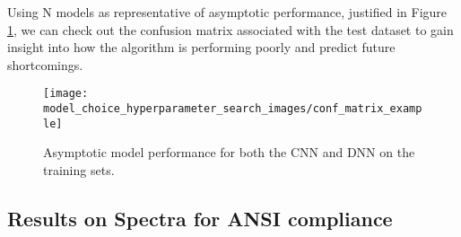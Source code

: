 Using N models as representative of asymptotic performance, justified in Figure \ref{fig:asymptotic_performance}, we can check out the confusion matrix associated with the test dataset to gain insight into how the algorithm is performing poorly and predict future shortcomings.


\begin{figure}[H]
	\centering
	\texttt{[image: model\_choice\_hyperparameter\_search\_images/conf\_matrix\_example]}
	\caption{Asymptotic model performance for both the CNN and DNN on the training sets.}
	\label{fig:asymptotic_performance}
\end{figure}







\subsection{Results on Spectra for ANSI compliance}


